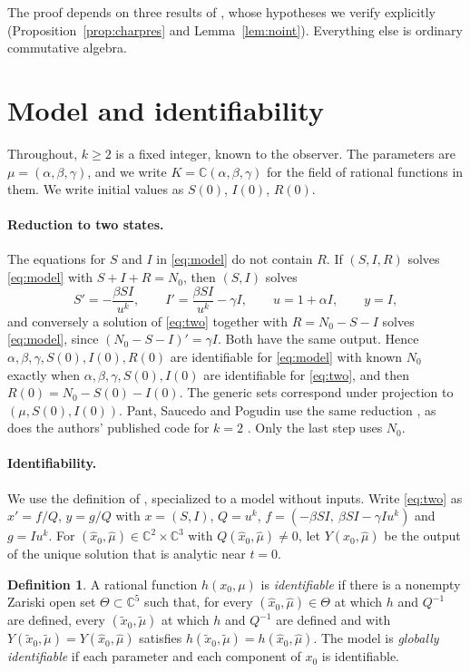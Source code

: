 \documentclass[10pt,a4paper]{article}
\theoremstyle{definition}
\newtheorem{definition}[theorem]{Definition}
\theoremstyle{remark}
\newcommand{\C}{\mathbb C}
\begin{document}
The proof depends on three results of \cite{OPT}, whose hypotheses we
verify explicitly (Proposition~\ref{prop:charpres} and
Lemma~\ref{lem:noint}). Everything else is ordinary commutative algebra.

\section{Model and identifiability}
\label{sec:model}
Throughout, $k\geq2$ is a fixed integer, known to the observer. The
parameters are $\mu=(\alpha,\beta,\gamma)$, and we write
$K=\C(\alpha,\beta,\gamma)$ for the field of rational functions in them.
We write initial values as $S(0)$, $I(0)$, $R(0)$.

\paragraph{Reduction to two states.}
The equations for $S$ and $I$ in \eqref{eq:model} do not contain $R$.
If $(S,I,R)$ solves \eqref{eq:model} with $S+I+R=N_0$, then $(S,I)$ solves
\begin{equation}
 S'=-\frac{\beta SI}{u^k},\qquad
 I'=\frac{\beta SI}{u^k}-\gamma I,\qquad u=1+\alpha I,
 \qquad y=I,
 \label{eq:two}
\end{equation}
and conversely a solution of \eqref{eq:two} together with $R=N_0-S-I$
solves \eqref{eq:model}, since $(N_0-S-I)'=\gamma I$. Both have the same
output. Hence $\alpha,\beta,\gamma,S(0),I(0),R(0)$ are identifiable for
\eqref{eq:model} with known $N_0$ exactly when
$\alpha,\beta,\gamma,S(0),I(0)$ are identifiable for \eqref{eq:two}, and
then $R(0)=N_0-S(0)-I(0)$. The generic sets correspond under projection
to $(\mu,S(0),I(0))$. Pant, Saucedo and Pogudin use the same reduction
\cite[(S9.2)]{PSPsupp}, as does the authors' published code for $k=2$
\cite{PSPcode}. Only the last step uses $N_0$.

\paragraph{Identifiability.}
We use the definition of \cite[Definition~2.2]{OPT}, specialized to a
model without inputs. Write \eqref{eq:two} as $x'=f/Q$, $y=g/Q$ with
$x=(S,I)$, $Q=u^k$, $f=(-\beta SI,\ \beta SI-\gamma Iu^k)$ and $g=Iu^k$.
For $(\hat x_0,\hat\mu)\in\C^2\times\C^3$ with
$Q(\hat x_0,\hat\mu)\neq0$, let $Y(\hat x_0,\hat\mu)$ be the output of the
unique solution that is analytic near $t=0$.

\begin{definition}
\label{def:id}
A rational function $h(x_0,\mu)$ is \emph{identifiable} if there is a
nonempty Zariski open set $\Theta\subset\C^5$ such that, for every
$(\hat x_0,\hat\mu)\in\Theta$ at which $h$ and $Q^{-1}$ are defined, every
$(\tilde x_0,\tilde\mu)$ at which $h$ and $Q^{-1}$ are defined and with
$Y(\tilde x_0,\tilde\mu)=Y(\hat x_0,\hat\mu)$ satisfies
$h(\tilde x_0,\tilde\mu)=h(\hat x_0,\hat\mu)$. The model is
\emph{globally identifiable} if each parameter and each component of
$x_0$ is identifiable.
\end{definition}
\end{document}
